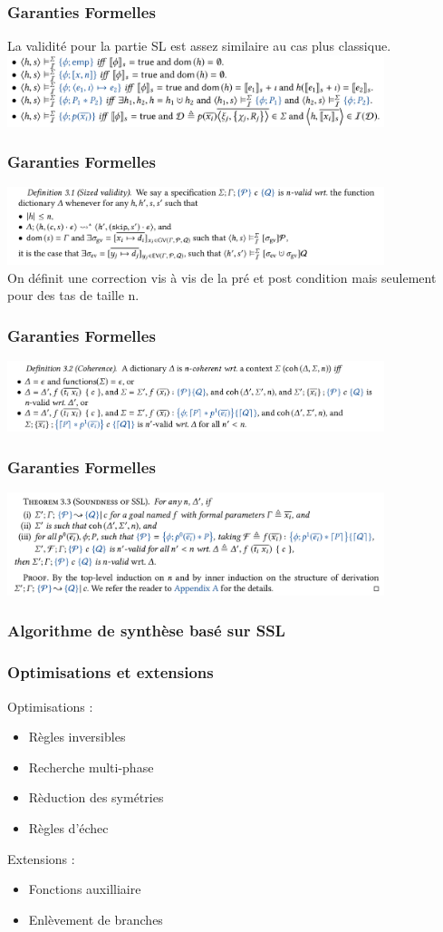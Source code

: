 \documentclass[french]{beamer}
\begin{document}
\begin{frame}[fragile]
	\frametitle{Garanties Formelles}
	La validité pour la partie SL est assez similaire au cas plus classique.\\
	\vspace{0.5cm}
	\includegraphics[width=11cm]{figures/satisfaction.png}
\end{frame}
\begin{frame}[fragile]
	\frametitle{Garanties Formelles}
	\includegraphics[width=11cm]{figures/nvalid.png}\\
	
	On définit une correction vis à vis de la pré et post condition mais seulement pour des tas de taille n.
\end{frame}
\begin{frame}[fragile]
	\frametitle{Garanties Formelles}
	\includegraphics[width=11cm]{figures/coherence.png}
\end{frame}
\begin{frame}[fragile]
	\frametitle{Garanties Formelles}
	\includegraphics[width=11cm]{figures/thm.png}
\end{frame}
\begin{frame}[fragile]
	\frametitle{Algorithme de synthèse basé sur SSL}
\end{frame}
\begin{frame}[fragile]
	\frametitle{Optimisations et extensions}
	Optimisations :
	\begin{itemize}
		\item Règles inversibles
		\pause
		\item Recherche multi-phase
		\pause
		\item Rèduction des symétries
		\pause
		\item Règles d'échec 
	\end{itemize}
	\pause
	Extensions :
	\begin{itemize}
	\item Fonctions auxilliaire
	\pause
	\item Enlèvement de branches	
	\end{itemize}
\end{frame}
\end{document}
